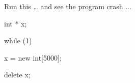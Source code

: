 Run this \ldots{} and see the program crash ...



\begin{consolethree}[escapeinside=||]

int * x;

while (1)

{

    x = new int[5000];

    delete x;

}

\end{consolethree}

